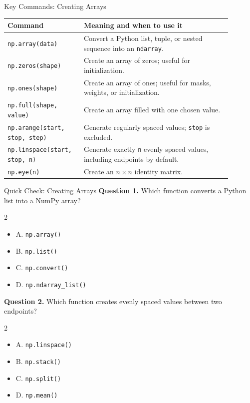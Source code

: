 \documentclass[aspectratio=169,11pt]{beamer}
\newcommand{\quiztitle}[1]{\textbf{\textcolor{QuizOrange}{#1}}}
\begin{document}
\begin{frame}{Key Commands: Creating Arrays}
\small
\begin{tabular}{p{0.28\linewidth}p{0.61\linewidth}}
\toprule
\textbf{Command} & \textbf{Meaning and when to use it} \\
\midrule
\texttt{np.array(data)} & Convert a Python list, tuple, or nested sequence into an \texttt{ndarray}. \\
\texttt{np.zeros(shape)} & Create an array of zeros; useful for initialization. \\
\texttt{np.ones(shape)} & Create an array of ones; useful for masks, weights, or initialization. \\
\texttt{np.full(shape, value)} & Create an array filled with one chosen value. \\
\texttt{np.arange(start, stop, step)} & Generate regularly spaced values; \texttt{stop} is excluded. \\
\texttt{np.linspace(start, stop, n)} & Generate exactly \texttt{n} evenly spaced values, including endpoints by default. \\
\texttt{np.eye(n)} & Create an \(n\times n\) identity matrix. \\
\bottomrule
\end{tabular}
\end{frame}

\begin{frame}{Quick Check: Creating Arrays}
\small
\quiztitle{Question 1.} Which function converts a Python list into a NumPy array?
\begin{multicols}{2}
\begin{itemize}
  \item A. \texttt{np.array()}
  \item B. \texttt{np.list()}
  \item C. \texttt{np.convert()}
  \item D. \texttt{np.ndarray\_list()}
\end{itemize}
\end{multicols}
\vspace{0.4em}
\quiztitle{Question 2.} Which function creates evenly spaced values between two endpoints?
\begin{multicols}{2}
\begin{itemize}
  \item A. \texttt{np.linspace()}
  \item B. \texttt{np.stack()}
  \item C. \texttt{np.split()}
  \item D. \texttt{np.mean()}
\end{itemize}
\end{multicols}
\end{frame}
\end{document}
